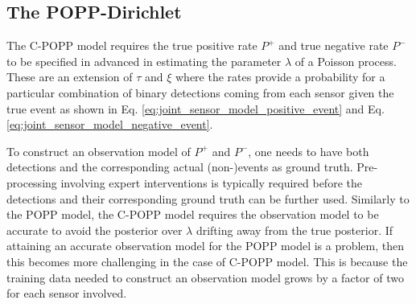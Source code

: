 
\subsection{The POPP-Dirichlet}
\label{subsec:popd}

The C-POPP model requires the true positive rate $P^+$ and true negative rate $P^-$ to be specified in advanced in estimating the parameter $\lambda$ of a Poisson process. These are an extension of $\tau$ and $\xi$ where the rates provide a probability for a particular combination of binary detections coming from each sensor given the true event as shown in Eq. \ref{eq:joint_sensor_model_positive_event} and Eq. \ref{eq:joint_sensor_model_negative_event}.

To construct an observation model of $P^+$ and $P^-$, one needs to have both detections and the corresponding actual (non-)events as ground truth. Pre-processing involving expert interventions is typically required before the detections and their corresponding ground truth can be further used. Similarly to the POPP model, the C-POPP model requires the observation model to be accurate to avoid the posterior over $\lambda$ drifting away from the true posterior. If attaining an accurate observation model for the POPP model is a problem, then this becomes more challenging in the case of C-POPP model. This is because the training data needed to construct an observation model grows by a factor of two for each sensor involved.       

